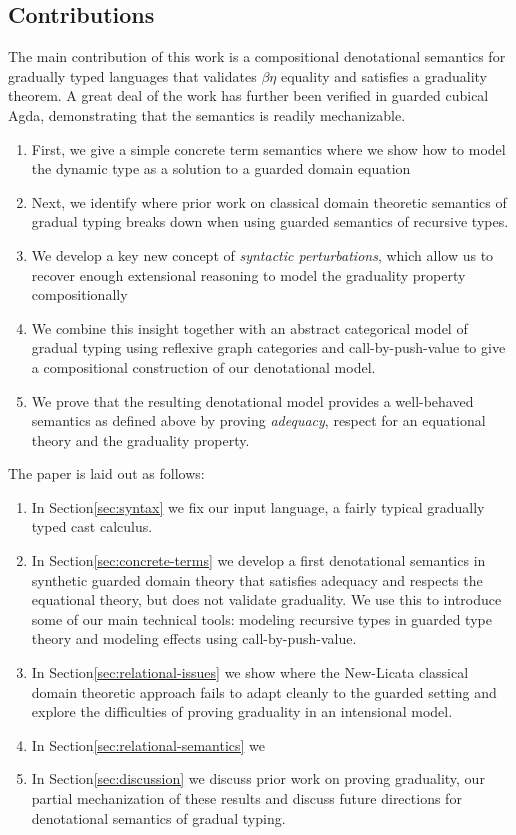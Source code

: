 
\subsection{Contributions}

The main contribution of this work is a compositional denotational
semantics for gradually typed languages that validates $\beta\eta$
equality and satisfies a graduality theorem. A great deal of the work
has further been verified in guarded cubical Agda, demonstrating that
the semantics is readily mechanizable.

\begin{enumerate}
\item First, we give a simple concrete term semantics where we show
  how to model the dynamic type as a solution to a guarded domain equation

\item Next, we identify where prior work on classical domain theoretic
  semantics of gradual typing breaks down when using guarded semantics
  of recursive types.

\item We develop a key new concept of \emph{syntactic perturbations},
  which allow us to recover enough extensional reasoning to model the
  graduality property compositionally

\item We combine this insight together with an abstract categorical
  model of gradual typing using reflexive graph categories and
  call-by-push-value to give a compositional construction of our
  denotational model.
\item We prove that the resulting denotational model provides a
  well-behaved semantics as defined above by proving \emph{adequacy},
  respect for an equational theory and the graduality property.
\end{enumerate}

The paper is laid out as follows:
\begin{enumerate}
\item In Section\ref{sec:syntax} we fix our input language, a fairly
  typical gradually typed cast calculus.
\item In Section\ref{sec:concrete-terms} we develop a first
  denotational semantics in synthetic guarded domain theory that
  satisfies adequacy and respects the equational theory, but does not
  validate graduality. We use this to introduce some of our main
  technical tools: modeling recursive types in guarded type theory and
  modeling effects using call-by-push-value.
\item In Section\ref{sec:relational-issues} we show where the
  New-Licata classical domain theoretic approach fails to adapt
  cleanly to the guarded setting and explore the difficulties of
  proving graduality in an intensional model.
\item In Section\ref{sec:relational-semantics} we
\item In Section\ref{sec:discussion} we discuss prior work on proving
  graduality, our partial mechanization of these results and discuss
  future directions for denotational semantics of gradual typing.
\end{enumerate}

